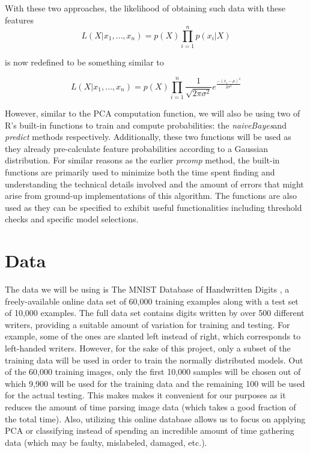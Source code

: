 \documentclass[twocolumn]{article}
\begin{document}
With these two approaches, the likelihood of obtaining such data with these features
$$L(X | x_1,\ldots, x_n ) = p(X) \prod_{i=1}^{n}p(x_i | X)$$

is now redefined to be something similar to

$$L(X |  x_1,\ldots, x_n ) = p(X) \prod_{i=1}^{n} \frac{1}{\sqrt{2 \pi \sigma^2}}  e^\frac{-(x_i - \mu)^2}{2 \sigma^2}$$

However, similar to the PCA computation function, we will also be using two of R's built-in functions to train and compute probabilities: the \emph{naiveBayes}and \emph{predict} methods respectively. Additionally, these two functions will be used as they already pre-calculate feature probabilities according to a Gaussian distribution. For similar reasons as the earlier \emph{prcomp} method, the built-in functions are primarily used to minimize both the time spent finding and understanding the technical details involved and the amount of errors that might arise from ground-up implementations of this algorithm. The functions are also used as they can be specified to exhibit useful functionalities including threshold checks and specific model selections.


\section{Data} %
\label{sec:data}
The data we will be using is The MNIST Database of Handwritten Digits \cite{mnist}
, a freely-available online data set of 60,000 training examples along with a test set of 10,000 examples. The full data set contains digits written by over 500 different writers, providing a suitable amount of variation for training and testing. For example, some of the ones are slanted left instead of right, which corresponds to left-handed writers. However, for the sake of this project, only a subset of the training data will be used in order to train the normally distributed models. Out of the 60,000 training images, only the first 10,000 samples will be chosen out of which 9,900 will be used for the training data and the remaining 100 will be used for the actual testing. This makes makes it convenient for our purposes as it reduces the amount of time parsing image data (which takes a good fraction of the total time). Also, utilizing this online database allows us to focus on applying PCA or classifying instead of spending an incredible amount of time gathering data (which may be faulty, mislabeled, damaged, etc.). 
\end{document}
